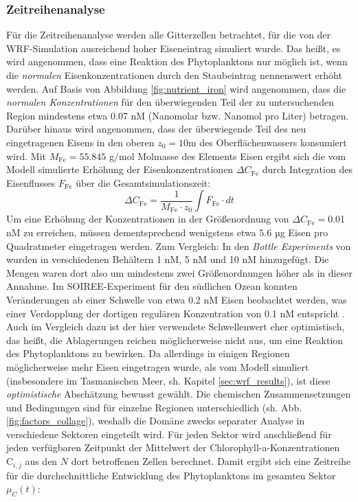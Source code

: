 \documentclass[12pt,a4paper,onecolumn,headheight=30pt]{scrartcl}
\begin{document}
\subsubsection{Zeitreihenanalyse} \label{sec:timeseries}
Für die Zeitreihenanalyse werden alle Gitterzellen betrachtet, für die von der WRF-Simulation ausreichend hoher Eiseneintrag simuliert wurde. Das heißt, es wird angenommen, dass eine Reaktion des Phytoplanktons nur möglich ist, wenn die \textit{normalen} Eisenkonzentrationen durch den Staubeintrag nennenswert erhöht werden. Auf Basis von Abbildung \ref{fig:nutrient_iron} wird angenommen, dass die \textit{normalen Konzentrationen} für den überwiegenden Teil der zu untersuchenden Region mindestens etwa 0.07 nM (Nanomolar bzw. Nanomol pro Liter) betragen. Darüber hinaus wird angenommen, dass der überwiegende Teil des neu eingetragenen Eisens in den oberen $z_0 = 10$m des Oberflächenwassers konsumiert wird. Mit  $M_{\text{Fe}} =  55.845$ g/mol Molmasse des Elements Eisen ergibt sich die vom Modell simulierte Erhöhung der Eisenkonzentrationen $\Delta C_\text{Fe}$ durch Integration des Eisenflusses $F_\text{Fe}$ über die Gesamtsimulationszeit:
\begin{equation}
\Delta C_\text{Fe} = \frac{1}{M_\text{Fe} \cdot z_0} \int F_\text{Fe} \cdot dt
\end{equation}
Um eine Erhöhung der Konzentrationen in der Größenordnung von $\Delta C_\text{Fe}=$0.01 nM zu erreichen, müssen dementsprechend wenigstens etwa $5.6$ µg Eisen pro Quadratmeter eingetragen werden. Zum Vergleich: In den \textit{Bottle Experiments} von \citet{Martin.1988} wurden in verschiedenen Behältern 1 nM, 5 nM und 10 nM hinzugefügt. Die Mengen waren dort also um mindestens zwei Größenordnungen höher als in dieser Annahme. Im SOIREE-Experiment für den südlichen Ozean \citep{Trull.2001} konnten Veränderungen ab einer Schwelle von etwa 0.2 nM Eisen beobachtet werden, was einer Verdopplung der dortigen regulären Konzentration von 0.1 nM entspricht \citep{Boyd.2010}. Auch im Vergleich dazu ist der hier verwendete Schwellenwert eher optimistisch, das heißt, die Ablagerungen reichen möglicherweise nicht aus, um eine Reaktion des Phytoplanktons zu bewirken. Da allerdings in einigen Regionen möglicherweise mehr Eisen eingetragen wurde, als vom Modell simuliert (insbesondere im Tasmanischen Meer, sh. Kapitel \ref{sec:wrf_results}), ist diese \textit{optimistische} Abschätzung bewusst gewählt. Die  chemischen Zusammensetzungen und Bedingungen sind für einzelne Regionen unterschiedlich (sh. Abb. \ref{fig:factors_collage}), weshalb die Domäne zwecks separater Analyse in verschiedene Sektoren eingeteilt wird. Für jeden Sektor wird anschließend für jeden verfügbaren Zeitpunkt der Mittelwert der Chlorophyll-a-Konzentrationen $\text{C}_{i,j}$ aus den $N$ dort betroffenen Zellen berechnet. Damit ergibt sich eine Zeitreihe für die durchschnittliche Entwicklung des Phytoplanktons im gesamten Sektor $\mu_C(t)$:
\end{document}
